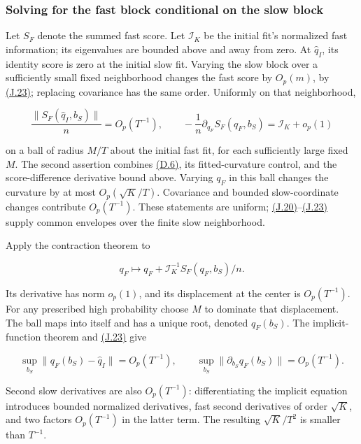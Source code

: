 \documentclass[11pt]{article}
\begin{document}
\subsubsection{Solving for the fast block conditional on the slow block}\label{sec:J.6.2}

Let \(S_F\) denote the summed fast score. Let \(\mathcal I_K\) be the initial fit's normalized fast information; its eigenvalues are bounded above and away from zero. At \(\widehat q_I\), its identity score is zero at the initial slow fit. Varying the slow block over a sufficiently small fixed neighborhood changes the fast score by \(O_p(m)\), by \hyperref[eq:J.23]{(J.23)}; replacing covariance has the same order. Uniformly on that neighborhood,

\begin{equation*}
\frac{\|S_F(\widehat q_I,b_S)\|}{n}=O_p(T^{-1}),\qquad
-\frac1n\partial_{q_F}S_F(q_F,b_S)=\mathcal I_K+o_p(1)
\tag{J.24}\label{eq:J.24}
\end{equation*}

on a ball of radius \(M/T\) about the initial fast fit, for each sufficiently large fixed \(M\). The second assertion combines \hyperref[eq:D.6]{(D.6)}, its fitted-curvature control, and the score-difference derivative bound above. Varying \(q_F\) in this ball changes the curvature by at most \(O_p(\sqrt K/T)\). Covariance and bounded slow-coordinate changes contribute \(O_p(T^{-1})\). These statements are uniform; \hyperref[eq:J.20]{(J.20)}--\hyperref[eq:J.23]{(J.23)} supply common envelopes over the finite slow neighborhood.

Apply the contraction theorem to

\begin{equation*}
q_F\longmapsto q_F+\mathcal I_K^{-1}S_F(q_F,b_S)/n.
\tag{J.25}\label{eq:J.25}
\end{equation*}

Its derivative has norm \(o_p(1)\), and its displacement at the center is \(O_p(T^{-1})\). For any prescribed high probability choose \(M\) to dominate that displacement. The ball maps into itself and has a unique root, denoted \(q_F(b_S)\). The implicit-function theorem and \hyperref[eq:J.23]{(J.23)} give

\begin{equation*}
\sup_{b_S}\|q_F(b_S)-\widehat q_I\|=O_p(T^{-1}),\qquad
\sup_{b_S}\|\partial_{b_S}q_F(b_S)\|=O_p(T^{-1}).
\tag{J.26}\label{eq:J.26}
\end{equation*}

Second slow derivatives are also \(O_p(T^{-1})\): differentiating the implicit equation introduces bounded normalized derivatives, fast second derivatives of order \(\sqrt K\), and two factors \(O_p(T^{-1})\) in the latter term. The resulting \(\sqrt K/T^2\) is smaller than \(T^{-1}\).
\end{document}
